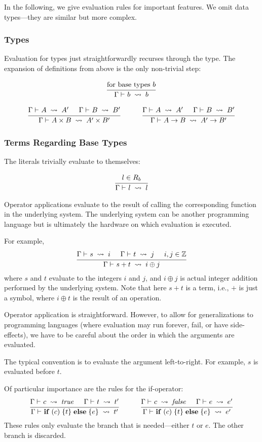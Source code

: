 In the following, we give evaluation rules for important features.
We omit data types---they are similar but more complex.

\subsubsection{Types}

Evaluation for types just straightforwardly recurses through the type.
The expansion of definitions from above is the only non-trivial step:

\[\cfrac{\text{for base types } b}{\Gamma\vdash^{}_{}b\;\rightsquigarrow\;b}\,
\]

\[
\rul{\evobj{}{\Gamma}{A}{A'} \tb \evobj{}{\Gamma}{B}{B'}}
    {\evobj{}{\Gamma}{A \times B}{A'\times B'}}
\tb\tb
\rul{\evobj{}{\Gamma}{A}{A'} \tb \evobj{}{\Gamma}{B}{B'}}
    {\evobj{}{\Gamma}{A \to B}{A'\to B'}}
\]

\subsubsection{Terms Regarding Base Types}

The literals trivially evaluate to themselves:

\[\cfrac{l\in R_b}{\Gamma\vdash^{}_{}l\;\rightsquigarrow\;l}\,
\]

Operator applications evaluate to the result of calling the corresponding function in the underlying system.
The underlying system can be another programming language but is ultimately the hardware on which evaluation is executed.

For example, 
\[\cfrac{\Gamma\vdash^{}_{}s\;\rightsquigarrow\;i \hspace*{.5cm} \Gamma\vdash^{}_{}t\;\rightsquigarrow\;j \hspace*{.5cm} i,j\in \mathbb{Z}}{\Gamma\vdash^{}_{}s+t\;\rightsquigarrow\;i\oplus j}\,
\]
where $s$ and $t$ evaluate to the integers $i$ and $j$, and $i\oplus j $ is actual integer addition performed by the underlying system.
Note that here $s+t$ is a term, i.e., $+$ is just a symbol, where $i\oplus t$ is the result of an operation.
\medskip

Operator application is straightforward.
However, to allow for generalizations to programming languages (where evaluation may run forever, fail, or have side-effects), we have to be careful about the order in which the arguments are evaluated.

The typical convention is to evaluate the argument left-to-right.
For example, $s$ is evaluated before $t$.
\medskip

Of particular importance are the rules for the if-operator:
\[\rul{\evobj{}{\Gamma}{c}{\true}\tb \evobj{}{\Gamma}{t}{t'}}
      {\evobj{}{\Gamma}{\aifelseI{c}{t}{e}}{t'}}
\tb\tb
\rul{\evobj{}{\Gamma}{c}{\false}\tb \evobj{}{\Gamma}{e}{e'}}
      {\evobj{}{\Gamma}{\aifelseI{c}{t}{e}}{e'}}
\]
These rules only evaluate the branch that is needed---either $t$ or $e$.
The other branch is discarded.

